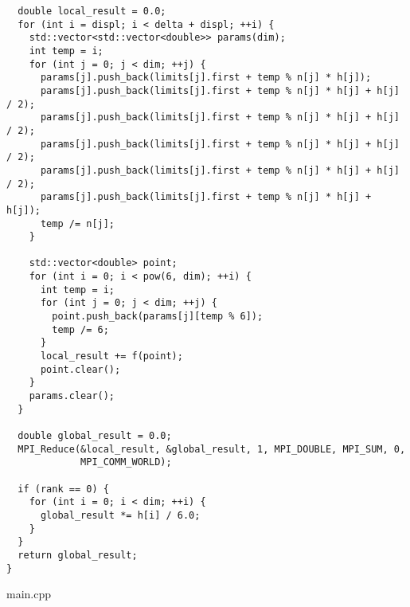 \documentclass{report}
\begin{document}
\begin{lstlisting}
  double local_result = 0.0;
  for (int i = displ; i < delta + displ; ++i) {
    std::vector<std::vector<double>> params(dim);
    int temp = i;
    for (int j = 0; j < dim; ++j) {
      params[j].push_back(limits[j].first + temp % n[j] * h[j]);
      params[j].push_back(limits[j].first + temp % n[j] * h[j] + h[j] / 2);
      params[j].push_back(limits[j].first + temp % n[j] * h[j] + h[j] / 2);
      params[j].push_back(limits[j].first + temp % n[j] * h[j] + h[j] / 2);
      params[j].push_back(limits[j].first + temp % n[j] * h[j] + h[j] / 2);
      params[j].push_back(limits[j].first + temp % n[j] * h[j] + h[j]);
      temp /= n[j];
    }

    std::vector<double> point;
    for (int i = 0; i < pow(6, dim); ++i) {
      int temp = i;
      for (int j = 0; j < dim; ++j) {
        point.push_back(params[j][temp % 6]);
        temp /= 6;
      }
      local_result += f(point);
      point.clear();
    }
    params.clear();
  }

  double global_result = 0.0;
  MPI_Reduce(&local_result, &global_result, 1, MPI_DOUBLE, MPI_SUM, 0,
             MPI_COMM_WORLD);

  if (rank == 0) {
    for (int i = 0; i < dim; ++i) {
      global_result *= h[i] / 6.0;
    }
  }
  return global_result;
}
\end{lstlisting}
main.cpp
\end{document}
